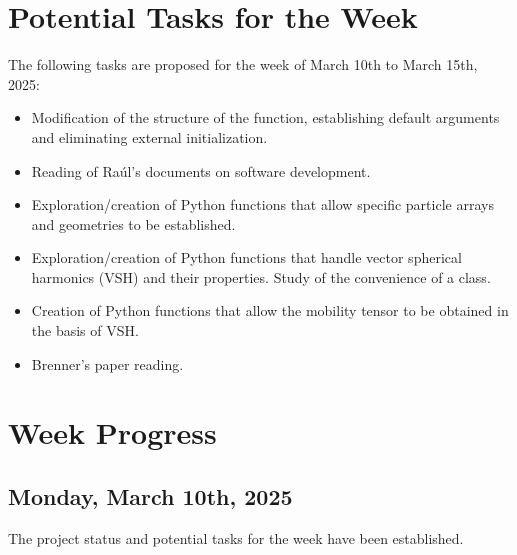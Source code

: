 \documentclass[12pt]{article}
\begin{document}
\section{Potential Tasks for the Week}
The following tasks are proposed for the week of March 10th to March 15th, 2025:
\begin{itemize}
    \item Modification of the structure of the  function, establishing default arguments and eliminating external initialization.
    \item Reading of Raúl's documents on software development.
    \item Exploration/creation of Python functions that allow specific particle arrays and geometries to be established.
    \item Exploration/creation of Python functions that handle vector spherical harmonics (VSH) and their properties. Study of the convenience of a class.
    \item Creation of Python functions that allow the mobility tensor to be obtained in the basis of VSH.
    \item Brenner's paper \cite{BRENNER1961242} reading.
\end{itemize}

\section{Week Progress}

\subsection{Monday, March 10th, 2025}
The project status and potential tasks for the week have been established.

\printbibliography
\end{document}
